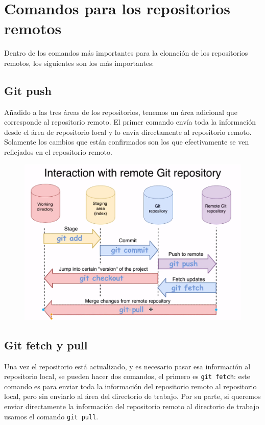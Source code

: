 \section{Comandos para los repositorios remotos}

Dentro de los comandos más importantes para la clonación de los repositorios remotos, los siguientes son los más importantes:

\subsection{Git push}

Añadido a las tres áreas de los repositorios, tenemos un área adicional que corresponde al repositorio remoto. El primer comando envía toda la información desde el área de repositorio local y lo envía directamente al repositorio remoto. Solamente los cambios que están confirmados son los que efectivamente se ven reflejados en el repositorio remoto. 

\begin{figure}[H]
    \centering
    \includegraphics[scale=0.5]{Github/Git_f9.png}
\end{figure}

\subsection{Git fetch y pull}

Una vez el repositorio está actualizado, y es necesario pasar esa información al repositorio local, se pueden hacer dos comandos, el primero es \texttt{git fetch}: este comando es para enviar toda la información del repositorio remoto al repositorio local, pero sin enviarlo al área del directorio de trabajo. Por su parte, si queremos enviar directamente la información del repositorio remoto al directorio de trabajo usamos el comando \texttt{git pull}. \\

